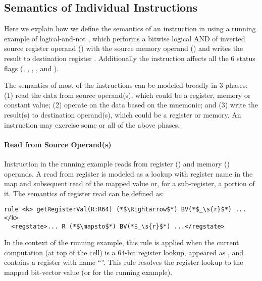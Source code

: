 \subsection{Semantics of Individual Instructions}
\label{sec:semantics-of-individual-instructions}

Here we explain how we define the semantics of an instruction in \K using a running example of logical-and-not , which performs a bitwise logical AND of inverted source register operand () with the source memory operand () and writes the result to destination register . Additionally the instruction affects all the $6$ status flags (, , , ,  and ).


%

The semantics of most of the instructions can be modeled broadly in $3$ phases: (1) read the data from source operand(s), which could be a register, memory or constant value; (2) operate on the data based on the mnemonic; and (3) write the result(s) to destination operand(s), which could be a register or memory. An instruction may exercise some or all of the above phases. 
   
\paragraph{Read from Source Operand(s)}
Instruction in the running example reads from  register () and memory () operands. A read from register is modeled as a lookup with register name in the  map and subsequent read of the mapped value or,
for a sub-register, a portion of it. The semantics of register read can be defined as:  
\begin{lstlisting}[style=KRULE]
rule <k> getRegisterVal(R:R64) (*$\Rightarrow$*) BV(*$_\s{r}$*) ...</k>
  <regstate>... R (*$\mapsto$*) BV(*$_\s{r}$*) ...</regstate>
\end{lstlisting}
 In the context of the running example, this rule
is applied when the current computation (at top of the  cell) is a $64$-bit register
lookup, appeared as  , and  contains a register
with name ``''. This rule resolves the register lookup  to the mapped bit-vector value  (or  for the running example). 

